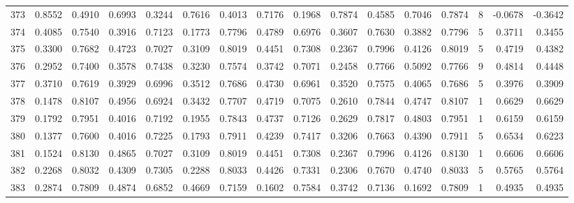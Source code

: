 \begin{tabular}{lrrrrrrrrrrrrrrr}
373 &      0.8552 &  0.4910 &  0.6993 &  0.3244 &  0.7616 &  0.4013 &  0.7176 &  0.1968 &  0.7874 &  0.4585 &   0.7046 &     0.7874 &      8 &                   -0.0678 &                    -0.3642 \\
374 &      0.4085 &  0.7540 &  0.3916 &  0.7123 &  0.1773 &  0.7796 &  0.4789 &  0.6976 &  0.3607 &  0.7630 &   0.3882 &     0.7796 &      5 &                    0.3711 &                     0.3455 \\
375 &      0.3300 &  0.7682 &  0.4723 &  0.7027 &  0.3109 &  0.8019 &  0.4451 &  0.7308 &  0.2367 &  0.7996 &   0.4126 &     0.8019 &      5 &                    0.4719 &                     0.4382 \\
376 &      0.2952 &  0.7400 &  0.3578 &  0.7438 &  0.3230 &  0.7574 &  0.3742 &  0.7071 &  0.2458 &  0.7766 &   0.5092 &     0.7766 &      9 &                    0.4814 &                     0.4448 \\
377 &      0.3710 &  0.7619 &  0.3929 &  0.6996 &  0.3512 &  0.7686 &  0.4730 &  0.6961 &  0.3520 &  0.7575 &   0.4065 &     0.7686 &      5 &                    0.3976 &                     0.3909 \\
378 &      0.1478 &  0.8107 &  0.4956 &  0.6924 &  0.3432 &  0.7707 &  0.4719 &  0.7075 &  0.2610 &  0.7844 &   0.4747 &     0.8107 &      1 &                    0.6629 &                     0.6629 \\
379 &      0.1792 &  0.7951 &  0.4016 &  0.7192 &  0.1955 &  0.7843 &  0.4737 &  0.7126 &  0.2629 &  0.7817 &   0.4803 &     0.7951 &      1 &                    0.6159 &                     0.6159 \\
380 &      0.1377 &  0.7600 &  0.4016 &  0.7225 &  0.1793 &  0.7911 &  0.4239 &  0.7417 &  0.3206 &  0.7663 &   0.4390 &     0.7911 &      5 &                    0.6534 &                     0.6223 \\
381 &      0.1524 &  0.8130 &  0.4865 &  0.7027 &  0.3109 &  0.8019 &  0.4451 &  0.7308 &  0.2367 &  0.7996 &   0.4126 &     0.8130 &      1 &                    0.6606 &                     0.6606 \\
382 &      0.2268 &  0.8032 &  0.4309 &  0.7305 &  0.2288 &  0.8033 &  0.4426 &  0.7331 &  0.2306 &  0.7670 &   0.4740 &     0.8033 &      5 &                    0.5765 &                     0.5764 \\
383 &      0.2874 &  0.7809 &  0.4874 &  0.6852 &  0.4669 &  0.7159 &  0.1602 &  0.7584 &  0.3742 &  0.7136 &   0.1692 &     0.7809 &      1 &                    0.4935 &                     0.4935 \\

\end{tabular}
